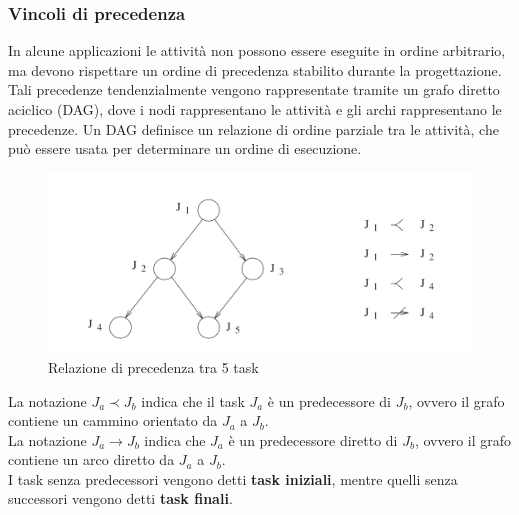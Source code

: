 \documentclass[12pt,openany,onesided]{book}
\begin{document}
\subsubsection{Vincoli di precedenza}
In alcune applicazioni le attività non possono essere eseguite in ordine arbitrario, ma devono rispettare un ordine di precedenza stabilito durante la progettazione.
Tali precedenze tendenzialmente vengono rappresentate tramite un grafo diretto aciclico (DAG), dove i nodi rappresentano le attività e gli archi rappresentano le precedenze.
Un DAG definisce un relazione di ordine parziale tra le attività, che può essere usata per determinare un ordine di esecuzione.
\begin{figure}[H]
    \includegraphics[width=\textwidth]{pictures/precedenzaTask.png}
    \caption{Relazione di precedenza tra 5 task}
\end{figure}
\noindent La notazione $J_a \prec J_b$ indica che il task $J_a$ è un predecessore di $J_b$, ovvero il grafo contiene un cammino orientato da $J_a$ a $J_b$.
\\
La notazione $J_a \rightarrow J_b$ indica che $J_a$ è un predecessore diretto di $J_b$, ovvero il grafo contiene un arco diretto da $J_a$ a $J_b$.
\\
I task senza predecessori vengono detti \textbf{task iniziali}, mentre quelli senza successori vengono detti \textbf{task finali}.
\end{document}
